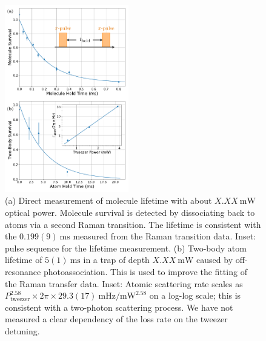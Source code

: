 \documentclass[aps,prl,twocolumn,10pt,superscriptaddress]{revtex4-1}
\begin{document}





\begin{figure}[t!]
  \includegraphics[width=0.48\textwidth]{imgs/fig-lifetime.pdf}
  \caption{
    (a) Direct measurement of molecule lifetime with about $X.XX~\mathrm{mW}$ optical power.
    Molecule survival is detected by dissociating back to atoms via a second Raman transition.
    The lifetime is consistent with the $0.199(9)~\mathrm{ms}$
    measured from the Raman transition data.
    Inset: pulse sequence for the lifetime measurement.
    (b) Two-body atom lifetime of $5(1)~\mathrm{ms}$
    in a trap of depth $X.XX~\mathrm{mW}$ caused by off-resonance photoassociation.
    This is used to improve the fitting of the Raman transfer data.
    Inset: Atomic scattering rate scales as
    $P_\textrm{tweezer}^{2.58}\times\!2\pi\!\times29.3(17)~\mathrm{mHz/mW^{2.58}}$ on a log-log scale;
    this is consistent with a two-photon scattering process.
    We have not measured a clear dependency of the loss rate on the tweezer detuning.
    \label{f-lifetime}}
\end{figure}
\end{document}
